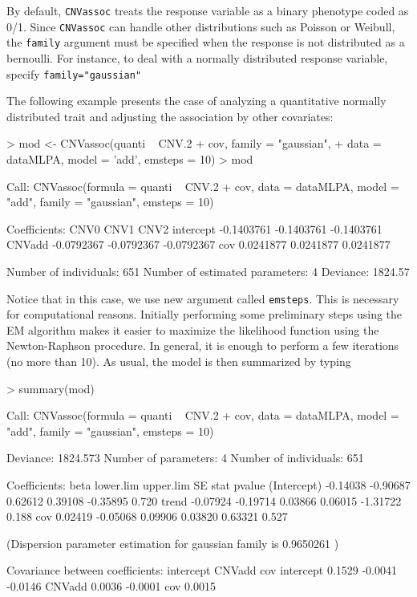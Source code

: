 \documentclass[11pt]{article}
\begin{document}
By default, \texttt{CNVassoc} treats the response variable as a binary phenotype coded as 0/1. 
Since \texttt{CNVassoc} can handle other distributions such as Poisson or Weibull, the \texttt{family} argument must be specified 
when the response is not distributed as a bernoulli.
For instance, to deal with a normally distributed response variable, specify \texttt{family="gaussian"}

The following example presents the case of analyzing a quantitative normally distributed trait and adjusting the association by other covariates: 


\begin{Schunk}
\begin{Sinput}
> mod <- CNVassoc(quanti ~ CNV.2 + cov, family = "gaussian", 
+ data = dataMLPA, model = 'add', emsteps = 10)
> mod
\end{Sinput}
\begin{Soutput}
Call:  CNVassoc(formula = quanti ~ CNV.2 + cov, data = dataMLPA, model = "add",      family = "gaussian", emsteps = 10) 

Coefficients:
           CNV0        CNV1        CNV2      
intercept  -0.1403761  -0.1403761  -0.1403761
CNVadd     -0.0792367  -0.0792367  -0.0792367
cov         0.0241877   0.0241877   0.0241877

Number of individuals: 651 
Number of estimated parameters: 4 
Deviance: 1824.57 
\end{Soutput}
\end{Schunk}



Notice that in this case, we use new argument called {\tt emsteps}. This is necessary for computational reasons. Initially performing 
some preliminary steps using the EM algorithm makes it easier to maximize the likelihood function using the Newton-Raphson procedure. 
In general, it is enough to perform a few iterations (no more than 10). As usual, the model is then summarized by typing


\begin{Schunk}
\begin{Sinput}
> summary(mod)
\end{Sinput}
\begin{Soutput}
Call:
CNVassoc(formula = quanti ~ CNV.2 + cov, data = dataMLPA, model = "add", 
    family = "gaussian", emsteps = 10)

Deviance: 1824.573 
Number of parameters: 4 
Number of individuals: 651 

Coefficients:
                beta lower.lim upper.lim       SE     stat pvalue
(Intercept) -0.14038  -0.90687   0.62612  0.39108 -0.35895  0.720
trend       -0.07924  -0.19714   0.03866  0.06015 -1.31722  0.188
cov          0.02419  -0.05068   0.09906  0.03820  0.63321  0.527

(Dispersion parameter estimation for  gaussian family is 0.9650261 )


Covariance between coefficients:
          intercept CNVadd  cov    
intercept  0.1529   -0.0041 -0.0146
CNVadd               0.0036 -0.0001
cov                          0.0015
\end{Soutput}
\end{Schunk}
\end{document}
